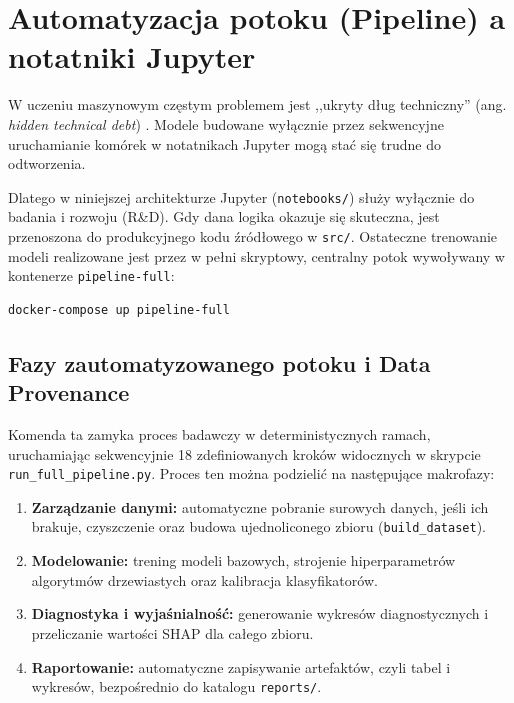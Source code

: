 \section{Automatyzacja potoku (Pipeline) a notatniki Jupyter}
\label{sec:automatyzacja-potoku-notatniki-jupyter}

W uczeniu maszynowym częstym problemem jest ,,ukryty dług techniczny'' (ang. \emph{hidden technical debt}) \cite{Sculley2015}. Modele budowane wyłącznie przez sekwencyjne uruchamianie komórek w notatnikach Jupyter mogą stać się trudne do odtworzenia.

Dlatego w niniejszej architekturze Jupyter (\texttt{notebooks/}) służy wyłącznie do badania i rozwoju (R\&D). Gdy dana logika okazuje się skuteczna, jest przenoszona do produkcyjnego kodu źródłowego w \texttt{src/}. Ostateczne trenowanie modeli realizowane jest przez w pełni skryptowy, centralny potok wywoływany w kontenerze \texttt{pipeline-full}:

\begin{lstlisting}[caption={Uruchomienie pełnego potoku eksperymentalnego},label={lst:pipeline-full-command}]
docker-compose up pipeline-full
\end{lstlisting}

\subsection{Fazy zautomatyzowanego potoku i Data Provenance}
\label{subsec:fazy-potoku-data-provenance}

Komenda ta zamyka proces badawczy w deterministycznych ramach, uruchamiając sekwencyjnie 18 zdefiniowanych kroków widocznych w skrypcie \texttt{run\_full\_pipeline.py}. Proces ten można podzielić na następujące makrofazy:

\begin{enumerate}
    \item \textbf{Zarządzanie danymi:} automatyczne pobranie surowych danych, jeśli ich brakuje, czyszczenie oraz budowa ujednoliconego zbioru (\texttt{build\_dataset}).
    \item \textbf{Modelowanie:} trening modeli bazowych, strojenie hiperparametrów algorytmów drzewiastych oraz kalibracja klasyfikatorów.
    \item \textbf{Diagnostyka i wyjaśnialność:} generowanie wykresów diagnostycznych i przeliczanie wartości SHAP dla całego zbioru.
    \item \textbf{Raportowanie:} automatyczne zapisywanie artefaktów, czyli tabel i wykresów, bezpośrednio do katalogu \texttt{reports/}.
\end{enumerate}

